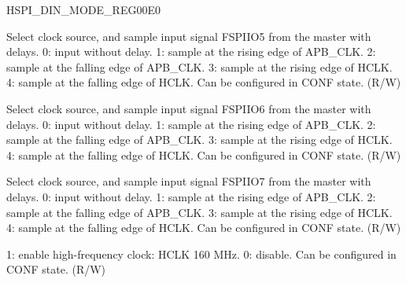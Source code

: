 \begin{register}{H}{SPI\_DIN\_MODE\_REG}{\hexprefix{}00E0}
\begin{regdesc}
\begin{reglist}
\label{fielddesc:SPIDIN5MODE}\item [SPI\_DIN5\_MODE] Select clock source, and sample input signal FSPIIO5 from the master with delays. 0: input without delay. 1: sample at the rising edge of APB\_CLK. 2: sample at the falling edge of APB\_CLK. 3: sample at the rising edge of HCLK. 4: sample at the falling edge of HCLK. Can be configured in CONF state. (R/W)
\label{fielddesc:SPIDIN6MODE}\item [SPI\_DIN6\_MODE] Select clock source, and sample input signal FSPIIO6 from the master with delays. 0: input without delay. 1: sample at the rising edge of APB\_CLK. 2: sample at the falling edge of APB\_CLK. 3: sample at the rising edge of HCLK. 4: sample at the falling edge of HCLK. Can be configured in CONF state. (R/W)
\label{fielddesc:SPIDIN7MODE}\item [SPI\_DIN7\_MODE] Select clock source, and sample input signal FSPIIO7 from the master with delays. 0: input without delay. 1: sample at the rising edge of APB\_CLK. 2: sample at the falling edge of APB\_CLK. 3: sample at the rising edge of HCLK. 4: sample at the falling edge of HCLK. Can be configured in CONF state. (R/W)
\label{fielddesc:SPITIMINGCLKENA}\item [SPI\_TIMING\_CLK\_ENA] 1: enable high-frequency clock: HCLK 160 MHz. 0: disable. Can be configured in CONF state. (R/W)
\end{reglist}\end{regdesc}
\end{register}


